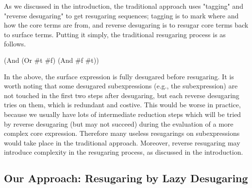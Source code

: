 As we discussed in the introduction, the traditional approach uses "tagging" and "reverse desugaring" to get resugaring sequences; tagging is to mark where and how the core terms are from, and reverse desugaring is to resugar core terms back to surface terms. Putting it simply, the traditional resugaring process is as follows.

\begin{Codes}
    (And (Or \#t \#f) (And \#f \#t))
 
\end{Codes}

In the above, the surface expression is fully desugared before resugaring. It is worth noting that some desugared subexpressions (e.g., the  subexpression) are not touched in the first two steps after desugaring, but each reverse desugaring tries on them, which is redundant and costive. This would be worse in practice, because we usually have lots of intermediate reduction steps which will be tried by reverse desugaring (but  may not succeed) during the evaluation of a more complex core expression. Therefore many useless resugarings on subexpressions would take place in the traditional approach. Moreover, reverse resugaring may introduce complexity in the resugaring process, as discussed in the introduction.

\subsection{Our Approach: Resugaring by Lazy Desugaring}

